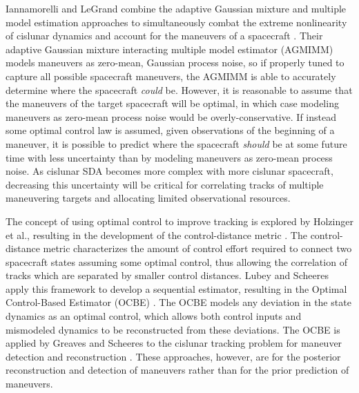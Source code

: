 
Iannamorelli and LeGrand combine the adaptive Gaussian mixture and multiple model estimation approaches to simultaneously combat the extreme nonlinearity of cislunar dynamics and account for the maneuvers of a spacecraft \cite{iannamorelli2025adaptive}. Their adaptive Gaussian mixture interacting multiple model estimator (AGMIMM) models maneuvers as zero-mean, Gaussian process noise, so if properly tuned to capture all possible spacecraft maneuvers, the AGMIMM is able to accurately determine where the spacecraft \textit{could} be. However, it is reasonable to assume that the maneuvers of the target spacecraft will be optimal, in which case modeling maneuvers as zero-mean process noise would be overly-conservative. If instead some optimal control law is assumed, given observations of the beginning of a maneuver, it is possible to predict where the spacecraft \textit{should} be at some future time with less uncertainty than by modeling maneuvers as zero-mean process noise. As cislunar SDA becomes more complex with more cislunar spacecraft, decreasing this uncertainty will be critical for correlating tracks of multiple maneuvering targets and allocating limited observational resources.

The concept of using optimal control to improve tracking is explored by Holzinger et al., resulting in the development of the control-distance metric \cite{holzinger2012object}. The control-distance metric characterizes the amount of control effort required to connect two spacecraft states assuming some optimal control, thus allowing the correlation of tracks which are separated by smaller control distances. Lubey and Scheeres apply this framework to develop a sequential estimator, resulting in the Optimal Control-Based Estimator (OCBE) \cite{lubey2013optimal}. The OCBE models any deviation in the state dynamics as an optimal control, which allows both control inputs and mismodeled dynamics to be reconstructed from these deviations. The OCBE is applied by Greaves and Scheeres to the cislunar tracking problem for maneuver detection and reconstruction \cite{greaves2021observation}. These approaches, however, are for the posterior reconstruction and detection of maneuvers rather than for the prior prediction of maneuvers. 

